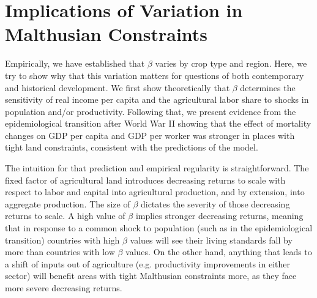 \documentclass[11pt]{article}
\begin{document}
\section{Implications of Variation in Malthusian Constraints}\label{SEC_implications}
Empirically, we have established that $\beta$ varies by crop type and region. Here, we try to show why that this variation matters for questions of both contemporary and historical development. We first show theoretically that $\beta$ determines the sensitivity of real income per capita and the agricultural labor share to shocks in population and/or productivity. Following that, we present evidence from the epidemiological transition after World War II showing that the effect of mortality changes on GDP per capita and GDP per worker was stronger in places with tight land constraints, consistent with the predictions of the model. 

The intuition for that prediction and empirical regularity is straightforward. The fixed factor of agricultural land introduces decreasing returns to scale with respect to labor and capital into agricultural production, and by extension, into aggregate production. The size of $\beta$ dictates the severity of those decreasing returns to scale. A high value of $\beta$ implies stronger decreasing returns, meaning that in response to a common shock to population (such as in the epidemiological transition) countries with high $\beta$ values will see their living standards fall by more than countries with low $\beta$ values. On the other hand, anything that leads to a shift of inputs out of agriculture (e.g. productivity improvements in either sector) will benefit areas with tight Malthusian constraints more, as they face more severe decreasing returns.
\end{document}
